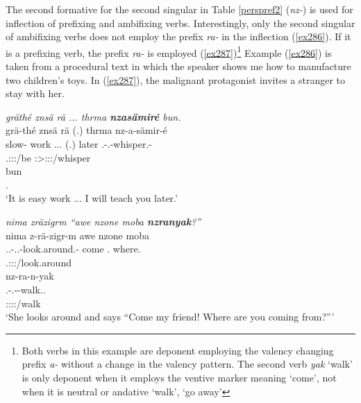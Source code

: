 The second formative for the second singular in Table \ref{perspref2} (\emph{nz-}) is used for  inflection of prefixing and ambifixing verbs. Interestingly, only the second  singular of ambifixing verbs does not employ the  prefix \emph{ra-} in the  inflection (\ref{ex286}). If it is a prefixing verb, the  prefix \emph{ra-} is employed (\ref{ex287})\footnote{Both verbs in this example are deponent employing the valency changing prefix \emph{a-} without a change in the valency pattern. The second verb \emph{yak} `walk' is only deponent when it employs the ventive marker meaning `come', not when it is neutral or andative `walk', `go away'} Example (\ref{ex286}) is taken from a procedural text in which the speaker shows me how to manufacture two children's toys. In (\ref{ex287}), the malignant protagonist invites a stranger to stay with her.

\begin{exe}
	\ex \emph{gräthé znsä rä ... thrma \textbf{nzasämiré} bun.}\\
	\glll grä-thé znsä rä (.) thrma nz-a-sämir-é\\
	slow-\Adlzr{} work \Tsg.\F.\Cop.\Ndu{} (.) later \Ssg.\Bet-\Vc.\Ndu-whisper.\Rs-\Fsg{}\\
	{} {} \footnotesize{\Tsg.\F:\Sbj:\Nonpast:\Ipfv/be} {} {} \footnotesize{\Fsg:\Sbj>\Ssg:\Io:\Irr:\Pfv/whisper}\\
	\sn
	\gll bun\\
	\Ssg.\Dat\\
	\trans `It is easy work ... I will teach you later.'
	\label{ex286}
\end{exe}
\begin{exe}
	\ex \emph{nima zräzigrm ``awe nzone moba \textbf{nzranyak}?''}\\
	\glll nima z-rä-zigr-m awe nzone moba\\
	\Quot{} \Tsg.\F.\Bet-\Irr.\Vc.\Ndu-look.around.\Rs-\Dur{} come \Fsg.\Poss{} where.\Abl{}\\
	{} \footnotesize{\Tsg.\F:\Sbj:\Irr:\Pfv/look.around} {} {} {}\\
	\sn
	\glll nz-ra-n-yak\\
	\Ssg.\Bet-\Irr.\Vc-\Venit-walk.\Ext.\Ndu\\
	\footnotesize{\Ssg:\Sbj:\Irr:\Ipfv:\Venit/walk}\\
	\trans `She looks around and says ``Come my friend! Where are you coming from?'''
	\label{ex287}
\end{exe}

